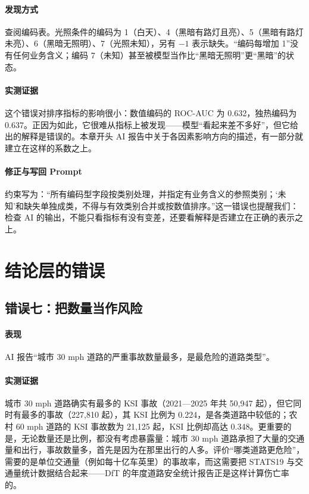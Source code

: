 \paragraph{发现方式} 查阅编码表。光照条件的编码为 1（白天）、4（黑暗有路灯且亮）、5（黑暗有路灯未亮）、6（黑暗无照明）、7（光照未知），另有 $-1$ 表示缺失。“编码每增加 1”没有任何业务含义；编码 7（未知）甚至被模型当作比“黑暗无照明”更“黑暗”的状态。

\paragraph{实测证据} 这个错误对排序指标的影响很小：数值编码的 ROC-AUC 为 0.632，独热编码为 0.637。正因为如此，它很难从指标上被发现——模型“看起来差不多好”，但它给出的解释是错误的。本章开头 AI 报告中关于各因素影响方向的描述，有一部分就建立在这样的系数之上。

\paragraph{修正与写回 Prompt} 约束写为：“所有编码型字段按类别处理，并指定有业务含义的参照类别；‘未知’和缺失单独成类，不得与有效类别合并或按数值排序。”这一错误也提醒我们：检查 AI 的输出，不能只看指标有没有变差，还要看解释是否建立在正确的表示之上。

\section{结论层的错误}

\subsection{错误七：把数量当作风险}

\paragraph{表现} AI 报告“城市 30 mph 道路的严重事故数量最多，是最危险的道路类型”。

\paragraph{实测证据} 城市 30 mph 道路确实有最多的 KSI 事故（2021—2025 年共 50,947 起），但它同时有最多的事故（227,810 起），其 KSI 比例为 0.224，是各类道路中较低的；农村 60 mph 道路的 KSI 事故数为 21,125 起，KSI 比例却高达 0.348。更重要的是，无论数量还是比例，都没有考虑暴露量：城市 30 mph 道路承担了大量的交通量和出行，事故数量多，首先是因为在那里出行的人多。评价“哪类道路更危险”，需要的是单位交通量（例如每十亿车英里）的事故率，而这需要把 STATS19 与交通量统计数据结合起来——DfT 的年度道路安全统计报告正是这样计算伤亡率的。

